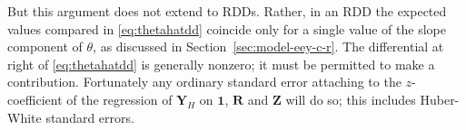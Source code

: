 But this argument does not extend to RDDs.  Rather, in an RDD the
expected values compared in \eqref{eq:thetahatdd} coincide only for a
single value of the slope component of $\theta$, as discussed in
Section~\ref{sec:model-eey-c-r}. The differential at right of
\eqref{eq:thetahatdd} is generally nonzero; it must be permitted to
make a contribution. Fortunately any ordinary standard error attaching
to the $z$-coefficient of the regression of ${\mathbf{Y}_{H}}$ on
$\mathbf{1}$, $\mathbf{R}$ and $\mathbf{Z}$ will do so; this includes
Huber-White standard errors.  





